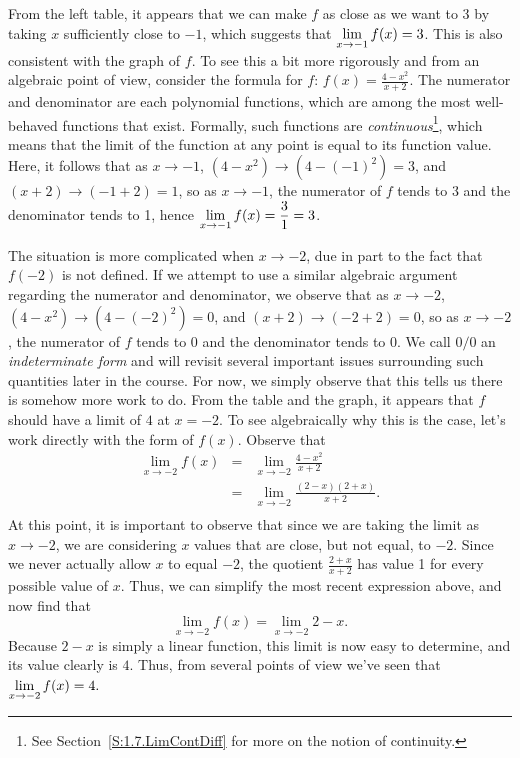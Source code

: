 From the left table, it appears that we can make $f$ as close as we want to 3 by taking $x$ sufficiently close to $-1$, which suggests that $\displaystyle \lim_{x \to -1} f(x) = 3$.	This is also consistent with the graph of $f$.  To see this a bit more rigorously and from an algebraic point of view, consider the formula for $f$:  $f(x) = \frac{4-x^2}{x+2}$.  The numerator and denominator are each polynomial functions, which are among the most well-behaved functions that exist.  Formally, such functions are \emph{continuous}\footnote{See Section~\ref{S:1.7.LimContDiff} for more on the notion of continuity.}, which means that the limit of the function at any point is equal to its function value.  Here, it follows that as $x \to -1$,  $(4-x^2) \to (4 - (-1)^2) = 3$, and $(x+2) \to (-1 + 2) = 1$, so as $x \to -1$, the numerator of $f$ tends to 3 and the denominator tends to 1, hence $\displaystyle \lim_{x \to -1} f(x) = \frac{3}{1} = 3$.

The situation is more complicated when $x \to -2$, due in part to the fact that $f(-2)$ is not defined.  If we attempt to use a similar algebraic argument regarding the numerator and denominator, we observe that as $x \to -2$, $(4-x^2) \to (4 - (-2)^2) = 0$, and $(x+2) \to (-2 + 2) = 0$, so as $x \to -2$, the numerator of $f$ tends to 0 and the denominator tends to 0.  We call $0/0$ an \emph{indeterminate form} and will revisit several important issues surrounding such quantities later in the course.  For now, we simply observe that this tells us there is somehow more work to do.  From the table and the graph, it appears that $f$ should have a limit of $4$ at $x = -2$.  To see algebraically why this is the case, let's work directly with the form of $f(x)$.  Observe that
\begin{eqnarray*}
	\lim_{x \to -2} f(x) & = & \lim_{x \to -2} \frac{4-x^2}{x+2} \\
				& = & \lim_{x \to -2} \frac{(2-x)(2+x)}{x+2}. \\
\end{eqnarray*}
At this point, it is important to observe that since we are taking the limit as $x \to -2$, we are considering $x$ values that are close, but not equal, to $-2$.  Since we never actually allow $x$ to equal $-2$, the quotient $\frac{2+x}{x+2}$ has value 1 for every possible value of $x$.  Thus, we can simplify the most recent expression above, and now find that
$$\lim_{x \to -2} f(x) = \lim_{x \to -2} 2-x.$$
Because $2-x$ is simply a linear function, this limit is now easy to determine, and its value clearly is $4$.  Thus, from several points of view we've seen that $\displaystyle\lim_{x \to -2} f(x) = 4.$

